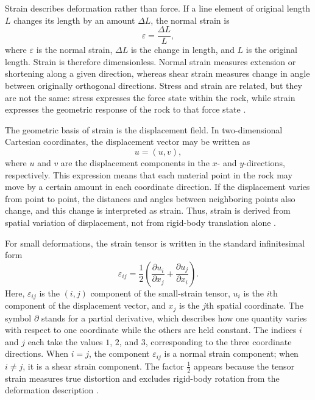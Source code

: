 Strain describes deformation rather than force. If a line element of original length $L$ changes its length by an amount $\Delta L$, the normal strain is
\begin{equation}
\varepsilon = \frac{\Delta L}{L},
\end{equation}
where $\varepsilon$ is the normal strain, $\Delta L$ is the change in length, and $L$ is the original length. Strain is therefore dimensionless. Normal strain measures extension or shortening along a given direction, whereas shear strain measures change in angle between originally orthogonal directions. Stress and strain are related, but they are not the same: stress expresses the force state within the rock, while strain expresses the geometric response of the rock to that force state \cite{jaeger2007,aki2002}.

The geometric basis of strain is the displacement field. In two-dimensional Cartesian coordinates, the displacement vector may be written as
\begin{equation}
u = (u, v),
\end{equation}
where $u$ and $v$ are the displacement components in the $x$- and $y$-directions, respectively. This expression means that each material point in the rock may move by a certain amount in each coordinate direction. If the displacement varies from point to point, the distances and angles between neighboring points also change, and this change is interpreted as strain. Thus, strain is derived from spatial variation of displacement, not from rigid-body translation alone \cite{aki2002,cornet2007}.

For small deformations, the strain tensor is written in the standard infinitesimal form
\begin{equation}
\label{eq:strain-disp}
\varepsilon_{ij}
=
\frac{1}{2}
\left(
\frac{\partial u_i}{\partial x_j}
+
\frac{\partial u_j}{\partial x_i}
\right).
\end{equation}
Here, $\varepsilon_{ij}$ is the $(i,j)$ component of the small-strain tensor, $u_i$ is the $i$th component of the displacement vector, and $x_j$ is the $j$th spatial coordinate. The symbol $\partial$ stands for a partial derivative, which describes how one quantity varies with respect to one coordinate while the others are held constant. The indices $i$ and $j$ each take the values $1$, $2$, and $3$, corresponding to the three coordinate directions. When $i=j$, the component $\varepsilon_{ij}$ is a normal strain component; when $i \neq j$, it is a shear strain component. The factor $\frac{1}{2}$ appears because the tensor strain measures true distortion and excludes rigid-body rotation from the deformation description \cite{aki2002,cornet2007}.


